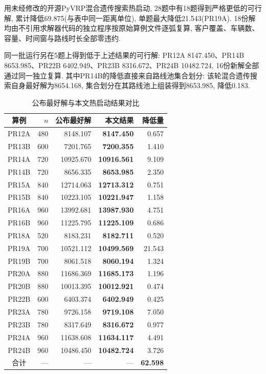 \documentclass{setp-new}
\newcommand{\setptabsetup}{\fontsize{9pt}{10.5pt}\selectfont\renewcommand{\arraystretch}{0.95}\setlength{\tabcolsep}{2.2pt}\setlength{\aboverulesep}{0.4pt}\setlength{\belowrulesep}{0.4pt}\hbadness=10000}
\begin{document}
用未经修改的开源PyVRP混合遗传搜索热启动, 28题中有18题得到严格更低的可行解,
累计降低69.875(与表中同一距离单位), 单题最大降低21.543(PR19A).
18份解均由不引用求解器代码的独立程序按原始算例文件逐弧复算,
客户覆盖、车辆数、容量、时间窗与路线时长全部零违约.

同一批运行另在5题上得到低于上述结果的可行解:
PR12A 8147.450、PR14B 8653.985、PR22B 6402.949、PR23B 8316.672、PR24B 10482.724,
16份新解全部通过同一独立复算.
其中PR14B的降低直接来自路线池集合划分: 该轮混合遗传搜索自身最好解为8654.168,
集合划分在其路线池上组装得到8653.985, 降低0.183.

\begin{table}[H]
\centering
\caption{公布最好解与本文热启动结果对比}
\label{tab:v13-improved}
\setptabsetup
\begin{tabular*}{\linewidth}{@{\extracolsep{\fill}}crrrr@{}}
\toprule
算例 & $n$ & 公布最好解 & 本文结果 & 降低量\\
\midrule
PR12A & 480 & 8148.107 & \textbf{8147.450} & 0.657 \\
PR13B & 600 & 7201.765 & \textbf{7200.355} & 1.410 \\
PR14A & 720 & 10925.670 & \textbf{10916.561} & 9.109 \\
PR14B & 720 & 8656.335 & \textbf{8653.985} & 2.350 \\
PR15A & 840 & 12714.063 & \textbf{12713.312} & 0.751 \\
PR15B & 840 & 10223.105 & \textbf{10221.947} & 1.158 \\
PR16A & 960 & 13992.681 & \textbf{13987.930} & 4.751 \\
PR16B & 960 & 11225.795 & \textbf{11225.109} & 0.686 \\
PR18A & 520 & 8183.231 & \textbf{8182.711} & 0.520 \\
PR19A & 700 & 10521.112 & \textbf{10499.569} & 21.543 \\
PR19B & 700 & 8061.518 & \textbf{8060.194} & 1.324 \\
PR20A & 880 & 11686.369 & \textbf{11685.173} & 1.196 \\
PR20B & 880 & 10013.395 & \textbf{10012.921} & 0.474 \\
PR22B & 600 & 6403.374 & \textbf{6402.949} & 0.425 \\
PR23A & 780 & 9726.158 & \textbf{9719.108} & 7.050 \\
PR23B & 780 & 8317.649 & \textbf{8316.672} & 0.977 \\
PR24A & 960 & 11638.608 & \textbf{11634.117} & 4.491 \\
PR24B & 960 & 10486.450 & \textbf{10482.724} & 3.726 \\
\midrule
合计 & --- & --- & --- & \textbf{62.598} \\
\bottomrule
\end{tabular*}
\end{table}
\end{document}
